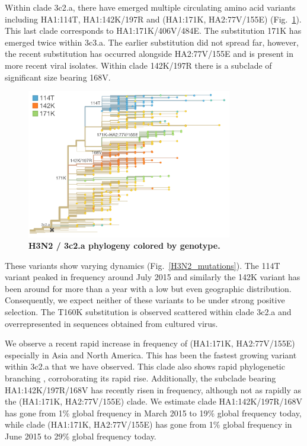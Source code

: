 \documentclass[11pt,oneside,letterpaper]{article}
\begin{document}
Within clade 3c2.a, there have emerged multiple circulating amino acid variants including HA1:114T, HA1:142K/197R and (HA1:171K, HA2:77V/155E) (Fig.\ \ref{H3N2_3c2a_tree}). This last clade corresponds to HA1:171K/406V/484E. The substitution 171K has emerged twice within 3c3.a. The earlier substitution did not spread far, however, the recent substitution has occurred alongside HA2:77V/155E and is present in more recent viral isolates. Within clade 142K/197R there is a subclade of significant size bearing 168V.

\begin{figure}[h!]
	\centering		
	\includegraphics[width=0.8\textwidth]{../figures/feb-2016/H3N2_3c2a_tree.png}
	\caption{\textbf{H3N2 / 3c2.a phylogeny colored by genotype.} 
	}
	\label{H3N2_3c2a_tree}
\end{figure}

These variants show varying dynamics (Fig.\ \ref{H3N2_mutations}). The 114T variant peaked in frequency around July 2015 and similarly the 142K variant has been around for more than a year with a low but even geographic distribution. Consequently, we expect neither of these variants to be under strong positive selection. The T160K substitution is observed scattered within clade 3c2.a and overrepresented in sequences obtained from cultured virus.

\pagebreak

We observe a recent rapid increase in frequency of (HA1:171K, HA2:77V/155E) especially in Asia and North America. This has been the fastest growing variant within 3c2.a that we have observed. This clade also shows rapid phylogenetic branching \cite{neher2014predicting}, corroborating its rapid rise. Additionally, the subclade bearing HA1:142K/197R/168V has recently risen in frequency, although not as rapidly as the (HA1:171K, HA2:77V/155E) clade. We estimate clade HA1:142K/197R/168V has gone from 1\% global frequency in March 2015 to 19\% global frequency today, while clade (HA1:171K, HA2:77V/155E) has gone from 1\% global frequency in June 2015 to 29\% global frequency today.
\end{document}
